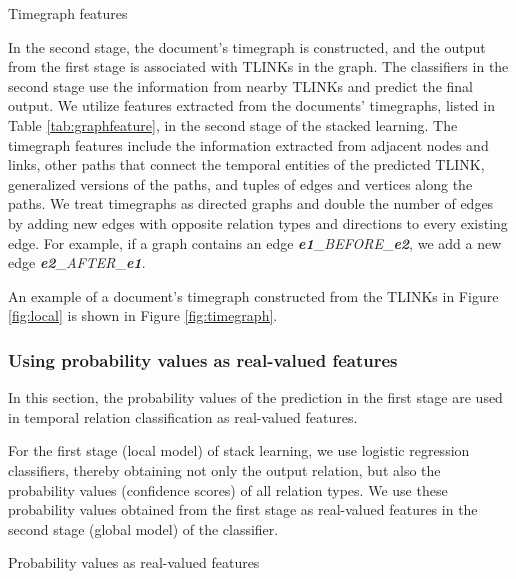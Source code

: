 \documentclass[english]{jnlp_1.4}
\begin{document}
\begin{table}[b]
\caption{Timegraph features}
\label{tab:graphfeature}

\end{table}

In the second stage, the document's timegraph is constructed, and the output from the first stage is associated with TLINKs in the graph. 
The classifiers in the second stage use the information from nearby TLINKs and predict the final output.
We utilize features extracted from the documents' timegraphs, listed in Table \ref{tab:graphfeature}, in the second stage of the stacked learning. 
The timegraph features include the information extracted from adjacent nodes and links, other paths that connect the temporal entities of the predicted TLINK, generalized versions of the paths, and tuples of edges and vertices along the paths.  
We treat timegraphs as directed graphs and double the number of edges by adding new edges with opposite relation types and directions to every existing edge.
For example, if a graph contains an edge \emph{\textbf{e1}}\_\emph{\footnotesize BEFORE}\_\emph{\textbf{e2}}, we add a new edge \emph{\textbf{e2}}\_\emph{\footnotesize AFTER}\_\emph{\textbf{e1}}.

An example of a document's timegraph constructed from the TLINKs in Figure \ref{fig:local} is shown in Figure \ref{fig:timegraph}.


\subsubsection{Using probability values as real-valued features}
\label{subsubsec:probfeature}

In this section, the probability values of the prediction in the first stage are used in temporal relation classification as real-valued features.

For the first stage (local model) of stack learning, we use logistic regression classifiers, thereby obtaining not only the output relation, but also the probability values (confidence scores) of all relation types.
We use these probability values obtained from the first stage as real-valued features in the second stage (global model) of the classifier.

\begin{table}[b]
\caption{Probability values as real-valued features}
\label{tab:probfeature}

\end{table}
\end{document}
